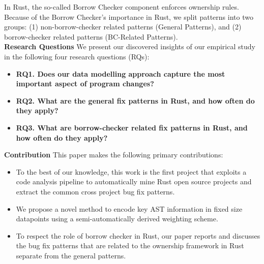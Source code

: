 In Rust, the so-called Borrow Checker component enforces ownership rules. Because of the Borrow Checker's importance in Rust, we split patterns into two groups: (1) non-borrow-checker related patterns (General Patterns), and (2) borrow-checker related patterns (BC-Related Patterns). \\

\noindent \textbf{Research Questions} We present our discovered insights of our empirical study in the following four research
questions (RQs):

\begin{itemize}
    \item \textbf{RQ1. Does our data modelling approach capture the most important aspect of program changes?} 
    \item \textbf{RQ2. What are the general fix patterns in Rust, and how often do they apply?} 
    \item \textbf{RQ3. What are borrow-checker related fix patterns in Rust, and how often do they apply?}
\end{itemize}



\noindent \textbf{Contribution} This paper makes the following primary contributions:

\begin{itemize}
    \item To the best of our knowledge, this work is the first project that exploits a code analysis pipeline to automatically mine Rust open source projects and extract the common cross project bug fix patterns.
    \item We propose a novel method to encode key AST information in fixed size datapoints using a semi-automatically derived weighting scheme.
    \item To respect the role of borrow checker in Rust, our paper reports and discusses the bug fix patterns that are related to the ownership framework in Rust separate from the general patterns.
\end{itemize}


